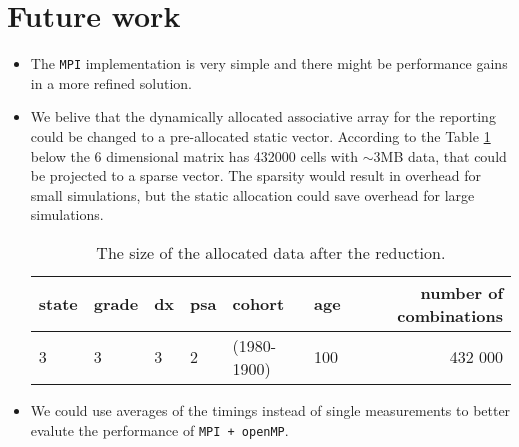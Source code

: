 \section{Future work}
\begin{itemize}
\item The \texttt{MPI} implementation is very simple and there might be
performance gains in a more refined solution.
\item We belive that the dynamically allocated associative array for
  the reporting could be changed to a pre-allocated static vector. According to the
  Table \ref{tab:comb} below the 6 dimensional matrix has 432000 cells
  with $\sim$3MB data, that could be projected to a sparse
  vector. The sparsity would result in overhead for small simulations,
  but the static allocation could save overhead for large simulations.

\begin{table}[!htbp]
  \begin{center}
    \begin{tabular}{ | l | l | l | l | l | l | r | }
      \hline
      state & grade & dx & psa & cohort      & age & number of combinations \\
      \hline
      3     & 3     & 3  & 2   & (1980-1900) & 100 & 432 000                \\
      \hline
    \end{tabular}
\end{center}
\caption{The size of the allocated data after the reduction.}
\label{tab:comb}
\end{table}

\item We could use averages of the timings instead of single measurements to better
  evalute the performance of \texttt{MPI + openMP}.
\end{itemize}

